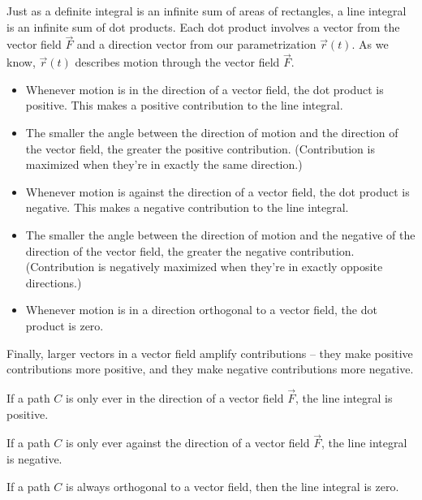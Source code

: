 Just as a definite integral is an infinite sum of areas of rectangles, a line integral is an infinite sum of dot products. Each dot product involves a vector from the vector field $\vec{F}$ and a direction vector from our parametrization $\vec{r}(t)$. As we know, $\vec{r}(t)$ describes motion through the vector field $\vec{F}$.
\begin{itemize}
    \item Whenever motion is in the direction of a vector field, the dot product is positive. This makes a positive contribution to the line integral.
    \item The smaller the angle between the direction of motion and the direction of the vector field, the greater the positive contribution. (Contribution is maximized when they're in exactly the same direction.)
    \item Whenever motion is against the direction of a vector field, the dot product is negative. This makes a negative contribution to the line integral.
    \item The smaller the angle between the direction of motion and the negative of the direction of the vector field, the greater the negative contribution. (Contribution is negatively maximized when they're in exactly opposite directions.)
    \item Whenever motion is in a direction orthogonal to a vector field, the dot product is zero.
\end{itemize}
Finally, larger vectors in a vector field amplify contributions -- they make positive contributions more positive, and they make negative contributions more negative.

\pagebreak 

\begin{framed}
    \noindent If a path $C$ is only ever in the direction of a vector field $\vec{F}$, the line integral is positive.
    
    \noindent If a path $C$ is only ever against the direction of a vector field $\vec{F}$, the line integral is negative.
    
    \noindent If a path $C$ is always orthogonal to a vector field, then the line integral  is zero.
\end{framed}

